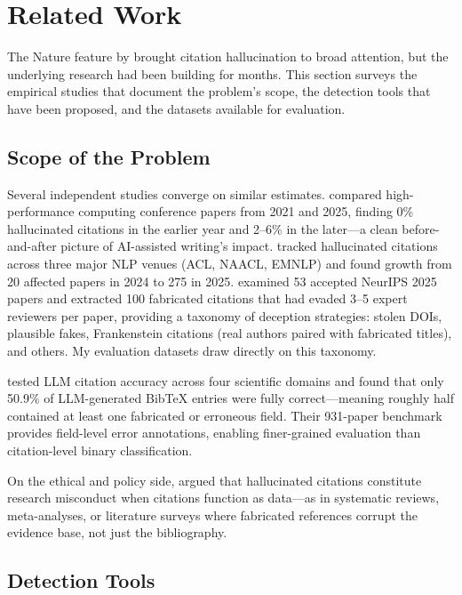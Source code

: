 \section{Related Work}

The Nature feature by \citet{naddaf2026} brought citation hallucination to broad attention, but the underlying research had been building for months. This section surveys the empirical studies that document the problem's scope, the detection tools that have been proposed, and the datasets available for evaluation.

\subsection{Scope of the Problem}

Several independent studies converge on similar estimates. \citet{bienz2026} compared high-performance computing conference papers from 2021 and 2025, finding 0\% hallucinated citations in the earlier year and 2--6\% in the later---a clean before-and-after picture of AI-assisted writing's impact. \citet{sakai2026} tracked hallucinated citations across three major NLP venues (ACL, NAACL, EMNLP) and found growth from 20 affected papers in 2024 to 275 in 2025. \citet{ansari2025} examined 53 accepted NeurIPS 2025 papers and extracted 100 fabricated citations that had evaded 3--5 expert reviewers per paper, providing a taxonomy of deception strategies: stolen DOIs, plausible fakes, Frankenstein citations (real authors paired with fabricated titles), and others. My evaluation datasets draw directly on this taxonomy.

\citet{rao2026} tested LLM citation accuracy across four scientific domains and found that only 50.9\% of LLM-generated BibTeX entries were fully correct---meaning roughly half contained at least one fabricated or erroneous field. Their 931-paper benchmark provides field-level error annotations, enabling finer-grained evaluation than citation-level binary classification.

On the ethical and policy side, \citet{resnik2026} argued that hallucinated citations constitute research misconduct when citations function as data---as in systematic reviews, meta-analyses, or literature surveys where fabricated references corrupt the evidence base, not just the bibliography.

\subsection{Detection Tools}

